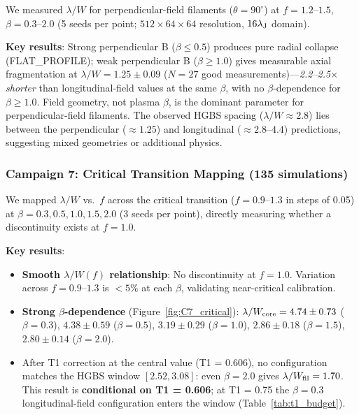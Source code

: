\documentclass[twoside,twocolumn]{mnras}
\begin{document}
We measured $\lambda/W$ for perpendicular-field filaments ($\theta = 90^\circ$) at
$f = 1.2$--$1.5$, $\beta = 0.3$--$2.0$ (5 seeds per point; $512\times64\times64$ resolution,
$16\lambda_{\rm J}$ domain).

\textbf{Key results}: Strong perpendicular B ($\beta \leq 0.5$) produces pure radial collapse
(FLAT\_PROFILE); weak perpendicular B ($\beta \geq 1.0$) gives measurable axial fragmentation
at $\lambda/W = 1.25 \pm 0.09$ ($N = 27$ good measurements)---\textit{2.2--2.5$\times$
shorter} than longitudinal-field values at the same $\beta$, with no $\beta$-dependence
for $\beta \geq 1.0$. Field geometry, not plasma $\beta$, is the dominant parameter for
perpendicular-field filaments. The observed HGBS spacing ($\lambda/W \approx 2.8$) lies
between the perpendicular (${\approx}1.25$) and longitudinal (${\approx}2.8$--$4.4$)
predictions, suggesting mixed geometries or additional physics.

\subsubsection{Campaign 7: Critical Transition Mapping (135 simulations)}

We mapped $\lambda/W$ vs.\ $f$ across the critical transition ($f = 0.9$--$1.3$ in
steps of 0.05) at $\beta = 0.3, 0.5, 1.0, 1.5, 2.0$ (3 seeds per point), directly
measuring whether a discontinuity exists at $f = 1.0$.

\textbf{Key results}:
\begin{itemize}
    \item \textbf{Smooth $\lambda/W(f)$ relationship}: No discontinuity at $f = 1.0$.
    Variation across $f = 0.9$--$1.3$ is $<5\%$ at each $\beta$, validating
    near-critical calibration.
    \item \textbf{Strong $\beta$-dependence} (Figure~\ref{fig:C7_critical}):
    $\lambda/W_{\rm core} = 4.74 \pm 0.73$ ($\beta = 0.3$), $4.38 \pm 0.59$ ($\beta = 0.5$),
    $3.19 \pm 0.29$ ($\beta = 1.0$), $2.86 \pm 0.18$ ($\beta = 1.5$),
    $2.80 \pm 0.14$ ($\beta = 2.0$).
    \item After T1 correction at the central value (T1 = 0.606), no configuration
    matches the HGBS window $[2.52, 3.08]$: even $\beta = 2.0$ gives
    $\lambda/W_{\rm fil} = 1.70$. This result is \textbf{conditional on T1 = 0.606};
    at T1 = 0.75 the $\beta = 0.3$ longitudinal-field configuration enters the window
    (Table~\ref{tab:t1_budget}).
\end{itemize}
\end{document}
